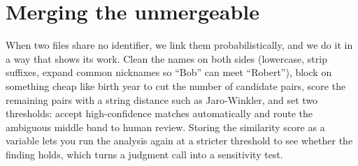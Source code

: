 \documentclass[
    a4paper,
    fontsize=10pt,
    twoside=true,
    numbers=noenddot,
]{kaobook}
\begin{document}
\section{Merging the unmergeable}
When two files share no identifier, we link them probabilistically, and we do it in a way that shows its work. Clean the names on both sides (lowercase, strip suffixes, expand common nicknames so \enquote{Bob} can meet \enquote{Robert}), block on something cheap like birth year to cut the number of candidate pairs, score the remaining pairs with a string distance such as Jaro-Winkler, and set two thresholds: accept high-confidence matches automatically and route the ambiguous middle band to human review. Storing the similarity score as a variable lets you run the analysis again at a stricter threshold to see whether the finding holds, which turns a judgment call into a sensitivity test.
\end{document}

